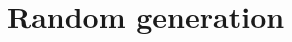 \documentclass{article}
\begin{document}
  \section{Random generation}
  \label{sec:Random generation}
\end{document}
